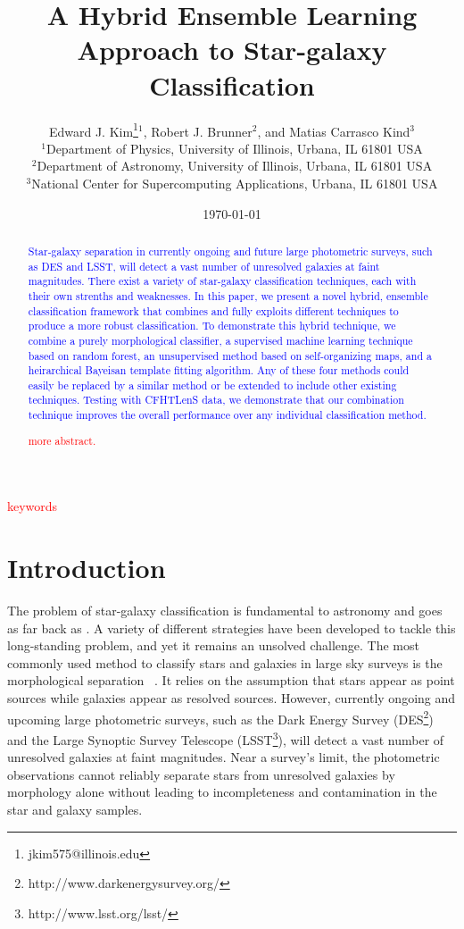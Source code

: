 \documentclass[useAMS,usenatbib]{mn2e}
\title{A Hybrid Ensemble Learning Approach to Star-galaxy Classification}
\author[E. J. Kim et al.]{
  Edward J. Kim\thanks{jkim575@illinois.edu}$^1$, Robert J. Brunner$^2$,
  and Matias Carrasco Kind$^3$\\
$^1$Department of Physics, University of Illinois, Urbana, IL 61801 USA\\
$^2$Department of Astronomy, University of Illinois, Urbana, IL 61801 USA\\
$^3$National Center for Supercomputing Applications, Urbana, IL 61801 USA}
\begin{document}
\date{\today}

\pagerange{\pageref{firstpage}--\pageref{lastpage}} 

\maketitle

\label{firstpage}
\begin{abstract}
\textcolor{blue}{
Star-galaxy separation in currently ongoing and future
large photometric surveys, such as DES and LSST,
will detect a vast number of unresolved galaxies at faint magnitudes.
There exist a variety of star-galaxy classification techniques,
each with their own strenths and weaknesses.
In this paper, we present a novel hybrid, ensemble classification
framework that combines and fully exploits different techniques
to produce a more robust classification.
To demonstrate this hybrid technique,
we combine a purely morphological classifier,
a supervised machine learning technique based on random forest,
an unsupervised method based on self-organizing maps,
and a heirarchical Bayeisan template fitting algorithm.
Any of these four methods could
easily be replaced by a similar method
or be extended to include other existing techniques.
Testing with CFHTLenS data,
we demonstrate that our combination technique improves
the overall performance over any individual classification method.}

\textcolor{red}{more abstract.}

\end{abstract}

\begin{keywords}
\textcolor{red}{keywords}
\end{keywords}


\section{Introduction}
  \label{section:introduction}

The problem of star-galaxy classification is fundamental to astronomy
and goes as far back as \cite{messier1781catalogue}.
A variety of different strategies have been developed 
to tackle this long-standing problem,
and yet it remains an unsolved challenge.
The most commonly used method to classify stars and galaxies
in large sky surveys is the morphological separation
~\citep{sebok1979optimal, kron1980photometry, valdes1982resolution,
yee1991faint, vasconcellos2011decision,
henrion2011bayesian}.
It relies on the assumption that
stars appear as point sources
while galaxies appear as resolved sources.
However,
currently ongoing and upcoming large photometric surveys,
such as the Dark Energy Survey
(DES\footnote{http://www.darkenergysurvey.org/})
and the Large Synoptic Survey Telescope
(LSST\footnote{http://www.lsst.org/lsst/}),
will detect a vast number of unresolved galaxies
at faint magnitudes.
Near a survey's limit, the photometric observations
cannot reliably separate stars from unresolved galaxies
by morphology alone without leading to
incompleteness and contamination in the star and galaxy samples.
\end{document}
